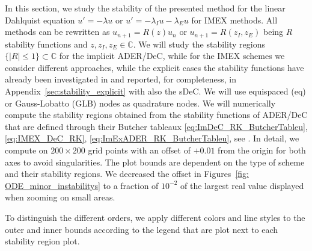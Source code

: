 In this section, we study the stability of the presented method for the linear Dahlquist equation $u' = -\lambda u$ or $u' = -\lambda_I u - \lambda_E u$ for IMEX methods. All methods can be rewritten as $u_{n+1} = R(z)u_n$ or $u_{n+1}= R(z_I,z_E)$ being $R$ stability functions and $z,z_I,z_E\in \mathbb C$. 
We will study the stability regions $\lbrace |R|\leq 1\rbrace \subset \mathbb C$ for the implicit ADER/DeC, while for the IMEX schemes we consider different approaches, while the explicit cases the stability functions have already been investigated in \cite{Han_Veiga_2021} and reported, for completeness, in Appendix~\ref{sec:stability_explicit} with also the sDeC. 
We will use equispaced (eq) or Gauss-Lobatto (GLB) nodes as quadrature nodes. 
We will numerically compute the stability regions obtained from the stability functions of ADER/DeC that are defined through their Butcher tableaux \eqref{eq:ImDeC_RK_ButcherTableu}, \eqref{eq:IMEX_DeC_RK}, \eqref{eq:ImExADER_RK_ButcherTableu}, see \cite{hairer1987solving}.
In detail, we compute on $200\times 200$ grid points with an offset of $+0.01$ from the origin for both axes to avoid singularities. 
The plot bounds are dependent on the type of scheme and their stability regions.
We decreased the offset in Figures~\ref{fig: ODE_minor_instabilitys} to a fraction of $10^{-2}$ of the largest real value displayed when zooming on small areas.

To distinguish the different orders, we apply different colors and line styles to the outer and inner bounds according to the legend that are plot next to each stability region plot.
